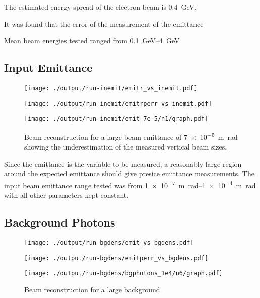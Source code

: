 The estimated energy spread of the electron beam is
\SI{0.4}{\giga\electronvolt}, 



It was found that the error of the measurement of the emittance 

Mean beam energies tested ranged from \SIrange{0.1}{4}{\giga\electronvolt}

\subsection{Input Emittance}

\begin{figure}[!tb]
	\centering
		\centering
		\texttt{[image: ./output/run-inemit/emitr\_vs\_inemit.pdf]}
		\caption{
		}
		\label{fig:emitr_inemit}
\end{figure}

\begin{figure}[!tb]
	\centering
		\centering
		\texttt{[image: ./output/run-inemit/emitrperr\_vs\_inemit.pdf]}
		\caption{
		}
		\label{fig:emitrperr_inemit}
\end{figure}

\begin{figure}[!tb]
	\centering
	\texttt{[image: ./output/run-inemit/emit\_7e-5/n1/graph.pdf]}
	\caption{
		Beam reconstruction for a large beam emittance of \SI{7e-5}{\meter\radian}
		showing the underestimation of the measured vertical beam sizes.
	}
	\label{fig:large_emit}
\end{figure}

Since the emittance is the variable to be measured, a reasonably large region
around the expected emittance should give presice emittance measurements. The
input beam emittance range tested was from \SIrange{1e-7}{1e-4}{\meter\radian}
with all other parameters kept constant.

\subsection{Background Photons}


\begin{figure}[!t]
	\centering
	\texttt{[image: ./output/run-bgdens/emit\_vs\_bgdens.pdf]}
	\caption{
	}
	\label{fig:emit_bgdens}
\end{figure}
\begin{figure}[!t]
	\centering
	\texttt{[image: ./output/run-bgdens/emitperr\_vs\_bgdens.pdf]}
	\caption{
	}
	\label{fig:emitperr_bgdens}
\end{figure}

\begin{figure}[!tb]
	\centering
	\texttt{[image: ./output/run-bgdens/bgphotons\_1e4/n6/graph.pdf]}
	\caption{
		Beam reconstruction for a large background.
	}
	\label{fig:large_bg}
\end{figure}



